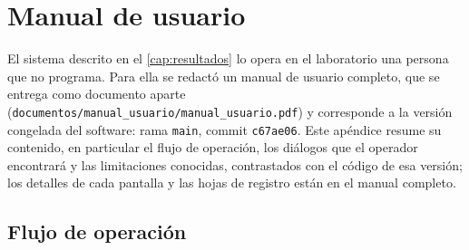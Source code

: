 \chapter{Manual de usuario}
\label{ap:manual_usuario}

El sistema descrito en el \cref{cap:resultados} lo opera en el
laboratorio una persona que no programa. Para ella se redactó un manual
de usuario completo, que se entrega como documento aparte
(\texttt{documentos/manual\_usuario/manual\_usuario.pdf}) y corresponde
a la versión congelada del software: rama \texttt{main}, commit
\texttt{c67ae06}. Este apéndice resume su contenido, en particular el
flujo de operación, los diálogos que el operador encontrará y las
limitaciones conocidas, contrastados con el código de esa versión; los
detalles de cada pantalla y las hojas de registro están en el manual
completo.

\section*{Flujo de operación}

